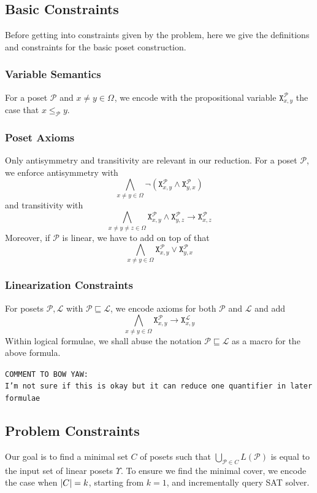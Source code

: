 \documentclass[12pt]{llncs}
\DeclarePairedDelimiter{\abs}{\lvert}{\rvert}
\let\oldleq\leq
\renewcommand{\leq}[1][]{\oldleq_{#1}}
\renewcommand{\implies}{\rightarrow}
\newcommand{\comment}[1]{\texttt{COMMENT TO BOW YAW:\\#1}}
\newcommand{\poset}[1]{\mathcal{#1}}
\newcommand{\uni}[1][]{\Omega_{#1}}
\newcommand{\lang}[1]{L(#1)}
\newcommand{\lext}{\sqsubseteq}
\newcommand{\satvar}[2]{\mathtt{X}_{#1}^{#2}}
\begin{document}
\subsection{Basic Constraints}
Before getting into constraints given by the problem, here we give the definitions and constraints for the basic poset construction.

\subsubsection{Variable Semantics}
For a poset $\poset{P}$ and $x \!\neq\! y \!\in\! \uni$, we encode with the propositional variable $\satvar{x,y}{\poset{P}}$ the case that $x \leq[\poset{P}] y$.

\subsubsection{Poset Axioms}
Only antisymmetry and transitivity are relevant in our reduction. For a poset $\poset{P}$, we enforce antisymmetry with
\[
\bigwedge_{x \neq y \in \uni} \neg (\satvar{x,y}{\poset{P}} \wedge \satvar{y,x}{\poset{P}})
\]
and transitivity with
\[
\bigwedge_{x \neq y \neq z \in \uni}
\satvar{x,y}{\poset{P}} \wedge \satvar{y,z}{\poset{P}} \implies \satvar{x,z}{\poset{P}}
\]
Moreover, if $\poset{P}$ is linear, we have to add on top of that
\[
\bigwedge_{x \neq y \in \uni} \satvar{x,y}{\poset{P}} \vee \satvar{y,x}{\poset{P}}
\]

\subsubsection{Linearization Constraints}
For posets $\poset{P},\poset{L}$ with $\poset{P} \lext \poset{L}$, we encode axioms for both $\poset{P}$ and $\poset{L}$ and add
\[
\bigwedge_{x \neq y \in \uni} \satvar{x,y}{\poset{P}} \implies \satvar{x,y}{\poset{L}}
\]
Within logical formulae, we shall abuse the notation $\poset{P} \lext \poset{L}$ as a macro for the above formula.
\label{subsubsec:linear}

\comment{I'm not sure if this is okay but it can reduce one quantifier in later formulae}

\subsection{Problem Constraints}
Our goal is to find a minimal set $C$ of posets such that $\bigcup_{\poset{P} \in C} \lang{\poset{P}}$ is equal to the input set of linear posets $\Upsilon$. To ensure we find the minimal cover, we encode the case when $\abs{C} = k$, starting from $k = 1$, and incrementally query SAT solver.
\end{document}
